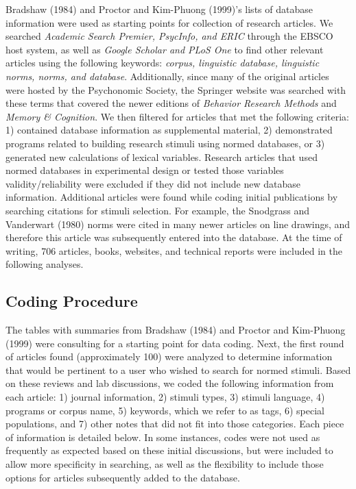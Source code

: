 \documentclass[english,man]{apa6}
\theoremstyle{definition}
\theoremstyle{definition}
\theoremstyle{definition}
\theoremstyle{remark}
\begin{document}
Bradshaw (1984) and Proctor and Kim-Phuong (1999)'s lists of database
information were used as starting points for collection of research
articles. We searched \emph{Academic Search Premier, PsycInfo, and ERIC}
through the EBSCO host system, as well as \emph{Google Scholar and PLoS
One} to find other relevant articles using the following keywords:
\emph{corpus, linguistic database, linguistic norms, norms, and
database}. Additionally, since many of the original articles were hosted
by the Psychonomic Society, the Springer website was searched with these
terms that covered the newer editions of \emph{Behavior Research
Methods} and \emph{Memory \& Cognition}. We then filtered for articles
that met the following criteria: 1) contained database information as
supplemental material, 2) demonstrated programs related to building
research stimuli using normed databases, or 3) generated new
calculations of lexical variables. Research articles that used normed
databases in experimental design or tested those variables
validity/reliability were excluded if they did not include new database
information. Additional articles were found while coding initial
publications by searching citations for stimuli selection. For example,
the Snodgrass and Vanderwart (1980) norms were cited in many newer
articles on line drawings, and therefore this article was subsequently
entered into the database. At the time of writing, 706 articles, books,
websites, and technical reports were included in the following analyses.

\subsection{Coding Procedure}\label{coding-procedure}

The tables with summaries from Bradshaw (1984) and Proctor and
Kim-Phuong (1999) were consulting for a starting point for data coding.
Next, the first round of articles found (approximately 100) were
analyzed to determine information that would be pertinent to a user who
wished to search for normed stimuli. Based on these reviews and lab
discussions, we coded the following information from each article: 1)
journal information, 2) stimuli types, 3) stimuli language, 4) programs
or corpus name, 5) keywords, which we refer to as tags, 6) special
populations, and 7) other notes that did not fit into those categories.
Each piece of information is detailed below. In some instances, codes
were not used as frequently as expected based on these initial
discussions, but were included to allow more specificity in searching,
as well as the flexibility to include those options for articles
subsequently added to the database.
\end{document}
